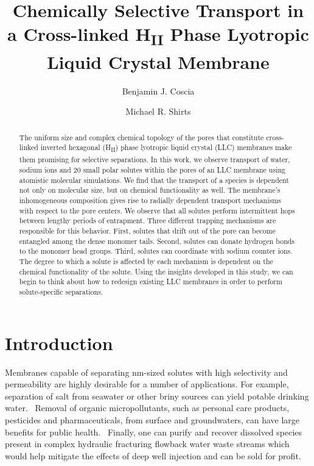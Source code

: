 \documentclass[journal=jpcbfk,manuscript=article]{achemso}
\title{Chemically Selective Transport in a Cross-linked H\textsubscript{II} Phase Lyotropic Liquid Crystal Membrane}
\author{Benjamin J. Coscia}
\affiliation{Department of Chemical and Biological Engineering, University of Colorado Boulder, Boulder, CO 80309, USA}
\author{Michael R. Shirts}
\affiliation{Department of Chemical and Biological Engineering, University of Colorado Boulder, Boulder, CO 80309, USA}
\begin{document}
  \graphicspath{{./figures/}}
  
  \begin{abstract}

  The uniform size and complex chemical topology of the pores that 
  constitute cross-linked inverted hexagonal (H\textsubscript{II})
  phase lyotropic liquid crystal (LLC) membranes make them promising
  for selective separations. In this work, we observe transport
  of water, sodium ions and 20 small polar solutes within the pores 
  of an LLC membrane using atomistic molecular simulations. We 
  find that the transport of a species is dependent not only on 
  molecular size, but on chemical functionality as well. The 
  membrane's inhomogeneous composition gives rise to radially dependent
  transport mechanisms with respect to the pore centers. 
  We 
  observe
  that all solutes perform intermittent hops between lengthy
  periods of entrapment. Three different trapping mechanisms are 
  responsible for this behavior. First, solutes that drift
  out of the pore can become entangled among the dense monomer
  tails. Second, solutes can donate hydrogen bonds to the monomer
  head groups. Third, solutes can coordinate with sodium counter ions.
  The degree to which a solute is affected by each mechanism is 
  dependent on the chemical functionality of the solute. Using the
  insights developed in this study, we can begin to think about 
  how to redesign existing LLC membranes in order to perform 
  solute-specific separations.
   
  \end{abstract}

  \section{Introduction}

  Membranes capable of separating nm-sized solutes with high selectivity and
  permeability are highly desirable for a number of applications. For example,
  separation of salt from seawater or other briny sources can yield potable
  drinking water.~\cite{fritzmann_state---art_2007} Removal of organic
  micropollutants, such as personal care products, pesticides and
  pharmaceuticals, from surface and groundwaters, can have large benefits for
  public health.~\cite{schwarzenbach_challenge_2006} Finally, one can purify and
  recover dissolved species present in complex hydraulic fracturing flowback
  water waste streams which would help mitigate the effects of deep well
  injection and can be sold for profit.~\cite{dischinger_application_2017} 
\end{document}
